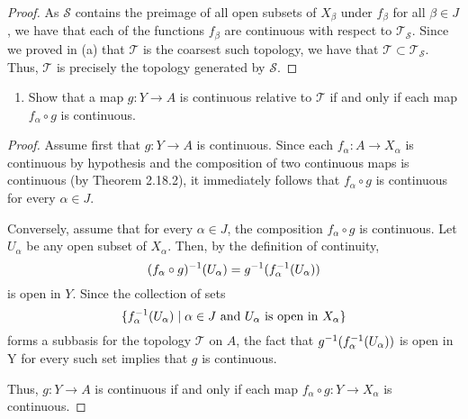 \begin{solution}
\begin{proof}
        As $\mathcal{S}$ contains the preimage of all open subsets of $X_\beta$ under $f_\beta$ for all $\beta \in J$, we have that each of the functions $f_\beta$ are continuous with respect to $\mathcal{T}_\mathcal{S}$.
        Since we proved in (a) that $\mathcal{T}$ is the coarsest such topology, we have that $\mathcal{T} \subset \mathcal{T}_\mathcal{S}$.
        Thus, $\mathcal{T}$ is precisely the topology generated by $\mathcal{S}$.
    \end{proof}
    \bigskip

    \begin{enumerate}[label={(\alph*)}, align=left, leftmargin=\parindent, listparindent=\parindent, labelwidth=0pt, itemindent=!]
        \addtocounter{enumi}{2} 
        \item Show that a map $g: Y \rightarrow A$ is continuous relative to $\mathcal{T}$ if and only if each map $f_\alpha \circ g$ is continuous.
    \end{enumerate}
    \begin{proof}
        Assume first that $g: Y \rightarrow A$ is continuous.
        Since each  $f_\alpha: A \rightarrow X_\alpha$ is continuous by hypothesis and the composition of two continuous maps is continuous (by Theorem 2.18.2), it immediately follows that $f_\alpha \circ g$ is continuous for every $\alpha \in J$.

        Conversely, assume that for every $\alpha \in J$, the composition $f_\alpha \circ g$ is continuous.
        Let $U_\alpha$ be any open subset of $X_\alpha$.
        Then, by the definition of continuity,
        \begin{equation*}
            (f_\alpha \circ g)^{-1}(U_\alpha) = g^{-1}(f_\alpha^{-1}(U_\alpha))
        \end{equation*}
        is open in $Y$.
        Since the collection of sets
        \begin{equation*}
            \{f_\alpha^{-1}(U_\alpha) \mid \alpha \in J \text{ and } U_\alpha \text{ is open in } X_\alpha\}
        \end{equation*}
        forms a subbasis for the topology $\mathcal{T}$ on $A$, the fact that $g^{-1}(f_\alpha^{-1}(U_\alpha))$ is open in Y for every such set implies that $g$ is continuous.

        Thus, $g: Y \rightarrow A$ is continuous if and only if each map $f_\alpha \circ g: Y \rightarrow X_\alpha$ is continuous.
    \end{proof}
    \bigskip


\end{solution}

